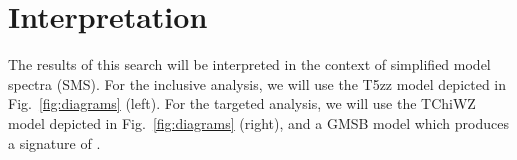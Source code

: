 \section{Interpretation}

The results of this search will be interpreted in the context of simplified model spectra (SMS).
For the inclusive analysis, we will use the T5zz model depicted in Fig.~\ref{fig:diagrams} (left).
For the targeted analysis, we will use the TChiWZ model depicted in Fig.~\ref{fig:diagrams} (right),
and a GMSB model which produces a signature of \zzmet.
